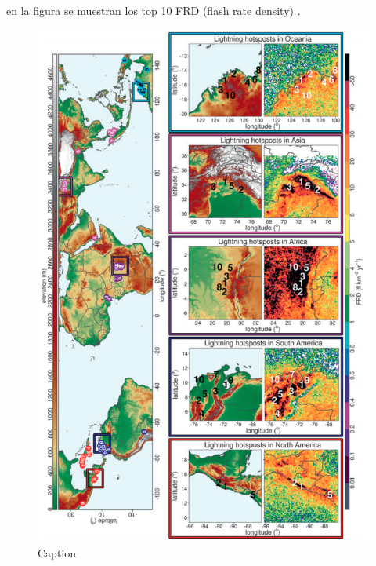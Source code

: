 \documentclass[12pt,oneside,openany,letter]{book}
\begin{document}
en la figura se muestran los top 10 FRD (flash rate density) \cite{AlbrechtEtal2016}. 
\begin{figure}
    \centering
    \includegraphics[scale=0.7]{figures/hotspots.png}
    \caption{Caption}
    \label{fig:my_label}
\end{figure}





\end{document}
